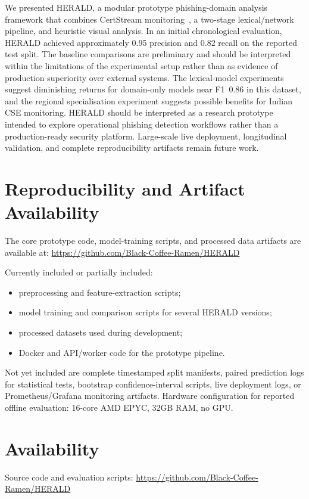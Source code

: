 \documentclass[conference]{IEEEtran}
\begin{document}
We presented HERALD, a modular prototype phishing-domain analysis framework that combines CertStream monitoring~\cite{certstream}, a two-stage lexical/network pipeline, and heuristic visual analysis. In an initial chronological evaluation, HERALD achieved approximately 0.95 precision and 0.82 recall on the reported test split. The baseline comparisons are preliminary and should be interpreted within the limitations of the experimental setup rather than as evidence of production superiority over external systems. The lexical-model experiments suggest diminishing returns for domain-only models near F1~0.86 in this dataset, and the regional specialisation experiment suggests possible benefits for Indian CSE monitoring. HERALD should be interpreted as a research prototype intended to explore operational phishing detection workflows rather than a production-ready security platform. Large-scale live deployment, longitudinal validation, and complete reproducibility artifacts remain future work.

\section*{Reproducibility and Artifact Availability}

The core prototype code, model-training scripts, and processed data artifacts are available at:
\url{https://github.com/Black-Coffee-Ramen/HERALD}

Currently included or partially included:
\begin{itemize}
    \item preprocessing and feature-extraction scripts;
    \item model training and comparison scripts for several HERALD versions;
    \item processed datasets used during development;
    \item Docker and API/worker code for the prototype pipeline.
\end{itemize}

Not yet included are complete timestamped split manifests, paired prediction logs for statistical tests, bootstrap confidence-interval scripts, live deployment logs, or Prometheus/Grafana monitoring artifacts. Hardware configuration for reported offline evaluation: 16-core AMD EPYC, 32GB RAM, no GPU.

\section*{Availability}
Source code and evaluation scripts: \url{https://github.com/Black-Coffee-Ramen/HERALD}
\end{document}
